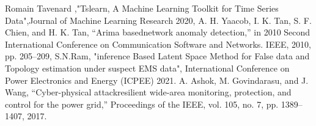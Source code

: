 \documentclass[conference]{IEEEtran}
\begin{document}
\begin{thebibliography}{00}
 Romain Tavenard ,"Tslearn, A Machine Learning Toolkit for Time Series Data",Journal of Machine Learning Research 2020,
A. H. Yaacob, I. K. Tan, S. F. Chien, and H. K. Tan, “Arima basednetwork anomaly detection,” in 2010 Second International Conference on Communication Software and Networks. IEEE, 2010, pp. 205–209,
 S.N.Ram, "inference Based Latent Space Method for False data and Topology estimation under suspect EMS data", International Conference on Power Electronics and Energy (ICPEE) 2021.
  A. Ashok, M. Govindarasu, and J. Wang, “Cyber-physical attackresilient wide-area monitoring, protection, and control for the power
grid,” Proceedings of the IEEE, vol. 105, no. 7, pp. 1389–1407, 2017.
\end{thebibliography}
\end{document}

